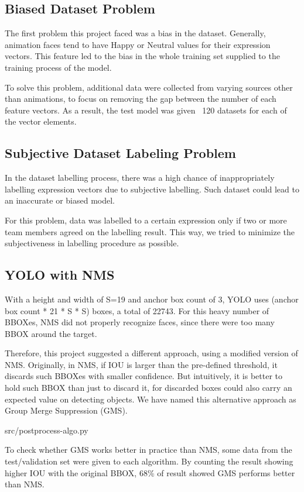 \documentclass{article}
\begin{document}
\subsection{Biased Dataset Problem}
The first problem this project faced was a bias in the dataset. Generally,
animation faces tend to have Happy or Neutral values for their expression
vectors. This feature led to the bias in the whole training set supplied to the
training process of the model.

To solve this problem, additional data were collected from varying sources other
than animations, to focus on removing the gap between the number of each feature
vectors. As a result, the test model was given ~120 datasets for each of the
vector elements.

\subsection{Subjective Dataset Labeling Problem}
In the dataset labelling process, there was a high chance of inappropriately
labelling expression vectors due to subjective labelling. Such dataset could
lead to an inaccurate or biased model.

For this problem, data was labelled to a certain expression only if two or more
team members agreed on the labelling result. This way, we tried to minimize the
subjectiveness in labelling procedure as possible.

\subsection{YOLO with NMS}
With a height and width of S=19 and anchor box count of 3, YOLO uses (anchor box
count * 21 * S * S) boxes, a total of 22743. For this heavy number of BBOXes,
NMS did not properly recognize faces, since there were too many BBOX around the
target.

Therefore, this project suggested a different approach, using a modified version
of NMS. Originally, in NMS, if IOU is larger than the pre-defined threshold, it
discards such BBOXes with smaller confidence. But intuitively, it is better to
hold such BBOX than just to discard it, for discarded boxes could also carry an
expected value on detecting objects. We have named this alternative approach as
Group Merge Suppression (GMS).

{src/postprocess-algo.py}

To check whether GMS works better in practice than NMS, some data from the
test/validation set were given to each algorithm. By counting the result showing
higher IOU with the original BBOX, 68\% of result showed GMS performs better
than NMS.
\end{document}
